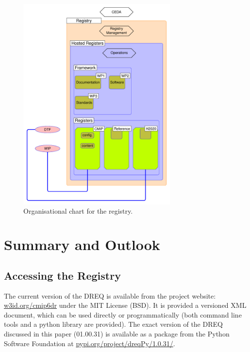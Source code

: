 \documentclass[gmd,dvipsnames]{copernicus}
\begin{document}
\begin{figure}[ht]
\includegraphics[width=8cm ]{../diagrams/reqreq01.pdf}
	\caption{
Organisational chart for the registry.
	}
	\label{fig:sketch}
\end{figure}




\section{Summary and Outlook}
\label{s:end}


\subsection{Accessing the Registry}

The current version of the DREQ is available from the project website: 
\href{https://w3id.org/cmip6dr}{w3id.org/cmip6dr}
under the MIT License (BSD).
It is provided a versioned XML document, which can be used directly or programmatically (both command line tools and a python library are provided). 
The exact version of the DREQ discussed in this paper (01.00.31) is available as a package from the Python Software Foundation at
\href{https://pypi.org/project/dreqPy/1.0.31/}{pypi.org/project/dreqPy/1.0.31/}.
\end{document}
